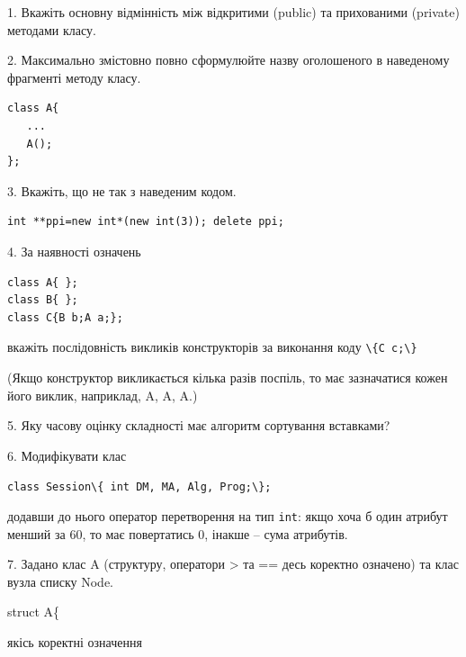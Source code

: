 \documentclass[12pt, ukrainian]{article}
\def\code#1{\Verb!#1!}
\begin{document}
{%
1. Вкажіть основну відмінність між відкритими (public) та прихованими (private) методами класу.%
\par
\vspace{2mm}
2. Максимально змістовно повно сформулюйте назву оголошеного в наведеному фрагменті методу класу.
\vspace{-3mm}
\begin{verbatim}class A{
   ...
   A();
};\end{verbatim}
\vspace{-3mm}
\par
\vspace{2mm}
3. Вкажіть, що не так з наведеним кодом.
\vspace{-3mm}
\begin{verbatim}int **ppi=new int*(new int(3)); delete ppi;\end{verbatim}
\vspace{-3mm}
\par
\vspace{2mm}
4. За наявності означень
\vspace{-3mm}
\begin{verbatim}
class A{ };
class B{ };
class C{B b;A a;};\end{verbatim}
\vspace{-3mm}
вкажіть послідовність викликів конструкторів за виконання коду \code{\{C c;\}} 

(Якщо конструктор викликається кілька разів поспіль, то має зазначатися кожен його виклик, наприклад, A, A, A.)

\vspace{2mm}
5. Яку часову оцінку складності має алгоритм сортування вставками?
\par
\vspace{2mm}
6. Модифікувати клас 

\qquad\code{class Session\{ int DM, MA, Alg, Prog;\};} 


додавши до нього оператор перетворення на тип \code{int}: якщо хоча б один атрибут менший за 60, то має повертатись 0, інакше -- сума атрибутів.%
\par
\vspace{2mm}
7. 
Задано клас A (структуру, оператори > та == десь коректно означено) та клас вузла списку Node.

struct A\{

\quad  якісь коректні означення 

}
\end{document}
